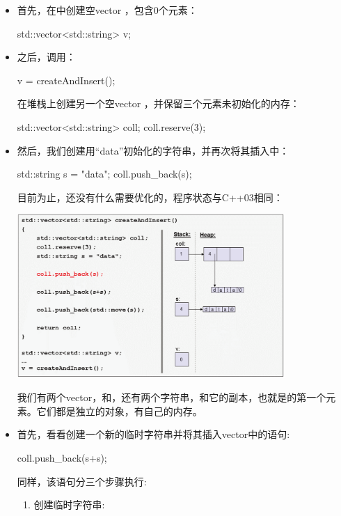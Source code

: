 \begin{itemize}
	\item 首先，在中创建空vector ，包含0个元素：
	\begin{cppcode}
std::vector<std::string> v;
	\end{cppcode}
	\item 之后，调用：
\begin{cppcode}
v = createAndInsert();
\end{cppcode}
	在堆栈上创建另一个空vector ，并保留三个元素未初始化的内存：
\begin{cppcode}
std::vector<std::string> coll;
coll.reserve(3);
\end{cppcode}
	\item 然后，我们创建用“data”初始化的字符串，并再次将其插入中：
\begin{cppcode}
std::string s = "data";
coll.push_back(s);
\end{cppcode}
	目前为止，还没有什么需要优化的，程序状态与C++03相同：
\begin{center}
		\includegraphics[width=0.8\textwidth]{part1/ch1/images/10}
	\end{center}
	我们有两个vector，和，还有两个字符串，和它的副本，也就是的第一个元素。它们都是独立的对象，有自己的内存。

	\item 首先，看看创建一个新的临时字符串并将其插入vector中的语句:
\begin{cppcode}
coll.push_back(s+s);
\end{cppcode}
	同样，该语句分三个步骤执行:

	\begin{enumerate}
		\item 创建临时字符串:


\end{enumerate}
\end{itemize}

